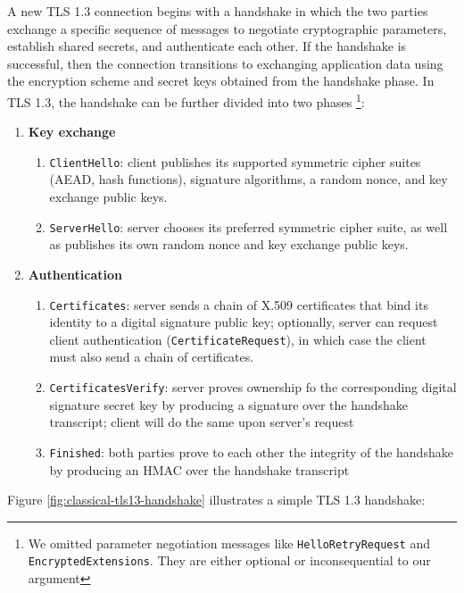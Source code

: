 \documentclass[letterpaper,12pt,titlepage,oneside,final]{book}
\begin{document}
A new TLS 1.3 connection begins with a handshake in which the two parties exchange a specific sequence of messages to negotiate cryptographic parameters, establish shared secrets, and authenticate each other.
If the handshake is successful, then the connection transitions to exchanging application data using the encryption scheme and secret keys obtained from the handshake phase.
In TLS 1.3, the handshake can be further divided into two phases \footnote{We omitted parameter negotiation messages like \texttt{HelloRetryRequest} and \texttt{EncryptedExtensions}. They are either optional or inconsequential to our argument}: \begin{enumerate}
    \item \textbf{Key exchange} \begin{enumerate}
        \item \texttt{ClientHello}: client publishes its supported symmetric cipher suites (AEAD, hash functions), signature algorithms, a random nonce, and key exchange public keys.
        \item \texttt{ServerHello}: server chooses its preferred symmetric cipher suite, as well as publishes its own random nonce and key exchange public keys.
    \end{enumerate}
    \item \textbf{Authentication} \begin{enumerate}
        \item \texttt{Certificates}: server sends a chain of X.509 certificates that bind its identity to a digital signature public key; optionally, server can request client authentication (\texttt{CertificateRequest}), in which case the client must also send a chain of certificates.
        \item \texttt{CertificatesVerify}: server proves ownership fo the corresponding digital signature secret key by producing a signature over the handshake transcript; client will do the same upon server's request
        \item \texttt{Finished}: both parties prove to each other the integrity of the handshake by producing an HMAC over the handshake transcript
    \end{enumerate}
\end{enumerate}

Figure \ref{fig:classical-tls13-handshake} illustrates a simple TLS 1.3 handshake:
\end{document}
